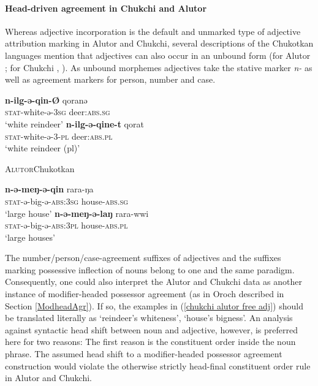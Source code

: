 \paragraph{Head-driven agreement in Chukchi and Alutor}
Whereas adjective incorporation is the default and unmarked type of adjective attribution marking in Alutor and Chukchi, several descriptions of the Chukotkan languages mention that adjectives can also occur in an unbound form (for Alutor \citealt{nagayama2003}; for Chukchi \citealt[103–104, 421–429]{skorik1960}, \citealt[251]{comrie1981}). As unbound morphemes adjectives take the stative marker \textit{n-} as well as agreement markers for person, number and case.
\begin{exe}
\ex \label{chukchi alutor free adj}
\begin{xlist}
\ex {}
\begin{xlist}
\ex
\gll	\textbf{n-ilg-ə-qin-Ø} qoranə\\
	\textsc{stat}-white-ə-\textsc{3sg} deer:\textsc{abs.sg}\\
\glt	‘white reindeer’
\ex
\gll	\textbf{n-ilg-ə-qine-t} qorat\\
	\textsc{stat}-white-ə-3-\textsc{pl} deer:\textsc{abs.pl}\\
\glt	‘white reindeer (pl)’
\end{xlist}
\ex \textsc{Alutor}{Chukotkan}{\cite{nagayama2003}}
\begin{xlist}
\ex
\gll	\textbf{n-ə-meŋ-ə-qin} rara-ŋa\\
	\textsc{stat}-ə-big-ə-\textsc{abs:3sg} house-\textsc{abs.sg}\\
\glt	‘large house’
\ex
\gll	\textbf{n-ə-meŋ-ə-laŋ} rara-wwi\\
	\textsc{stat}-ə-big-ə-\textsc{abs:3pl} house-\textsc{abs.pl}\\
\glt	‘large houses’
\end{xlist}
\end{xlist}
\end{exe}
The number/person/case-agreement suffixes of adjectives and the suffixes marking possessive inflection of nouns belong to one and the same paradigm. Consequently, one could also interpret the Alutor and Chukchi data as another instance of modifier-headed possessor agreement (as in Oroch described in Section \ref{ModheadAgr}). If so, the examples in (\ref{chukchi alutor free adj}) should be translated literally as ‘reindeer's whiteness’, ‘house's bigness’. An analysis against syntactic head shift between noun and adjective, however, is preferred here for two reasons: The first reason is the constituent order inside the noun phrase. The assumed head shift to a modifier-headed possessor agreement construction would violate the otherwise strictly head-final constituent order rule in Alutor and Chukchi. 

